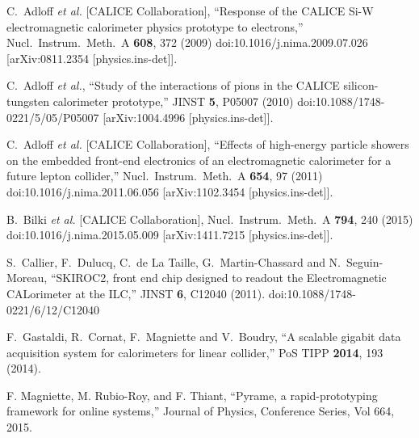 \documentclass[journal]{IEEEtran}
\begin{document}
\begin{thebibliography}{1}
  C.~Adloff {\it et al.} [CALICE Collaboration],
  ``Response of the CALICE Si-W electromagnetic calorimeter physics prototype to electrons,''
  Nucl.\ Instrum.\ Meth.\ A {\bf 608}, 372 (2009)
  doi:10.1016/j.nima.2009.07.026
  [arXiv:0811.2354 [physics.ins-det]].

  C.~Adloff {\it et al.},
  ``Study of the interactions of pions in the CALICE silicon-tungsten calorimeter prototype,''
  JINST {\bf 5}, P05007 (2010)
  doi:10.1088/1748-0221/5/05/P05007
  [arXiv:1004.4996 [physics.ins-det]].

  C.~Adloff {\it et al.} [CALICE Collaboration],
  ``Effects of high-energy particle showers on the embedded front-end electronics of an electromagnetic calorimeter for a future lepton collider,''
  Nucl.\ Instrum.\ Meth.\ A {\bf 654}, 97 (2011)
  doi:10.1016/j.nima.2011.06.056
  [arXiv:1102.3454 [physics.ins-det]].

  B.~Bilki {\it et al.} [CALICE Collaboration],
  Nucl.\ Instrum.\ Meth.\ A {\bf 794}, 240 (2015)
  doi:10.1016/j.nima.2015.05.009
  [arXiv:1411.7215 [physics.ins-det]].

  S.~Callier, F.~Dulucq, C.~de La Taille, G.~Martin-Chassard and N.~Seguin-Moreau,
  ``SKIROC2, front end chip designed to readout the Electromagnetic CALorimeter at the ILC,''
  JINST {\bf 6}, C12040 (2011).
  doi:10.1088/1748-0221/6/12/C12040

  F.~Gastaldi, R.~Cornat, F.~Magniette and V.~Boudry,
  ``A scalable gigabit data acquisition system for calorimeters for linear collider,''
  PoS TIPP {\bf 2014}, 193 (2014).

  F. Magniette, M. Rubio-Roy, and F. Thiant,
  ``Pyrame, a rapid-prototyping framework for online systems,''
  Journal of Physics, Conference Series, Vol 664, 2015.


\end{thebibliography}
\end{document}
